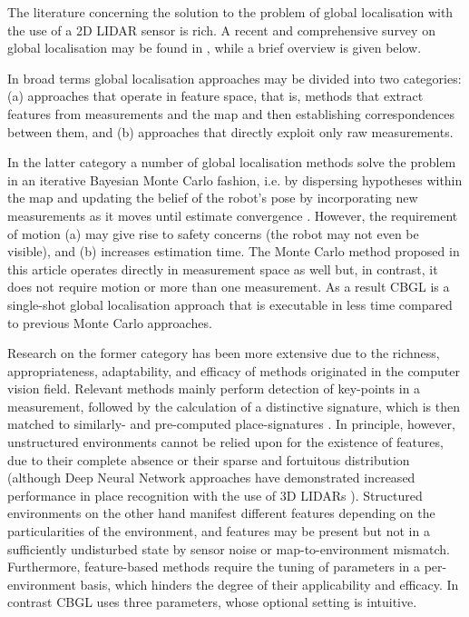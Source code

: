 The literature concerning the solution to the problem of global localisation
with the use of a 2D LIDAR sensor is rich. A recent and comprehensive survey on
global localisation may be found in \cite{gl_survey_cn}, while a brief overview
is given below.

In broad terms global localisation approaches may be divided
into two categories: (a) approaches that operate in feature space, that is,
methods that extract features from measurements and the map and then
establishing correspondences between them, and (b) approaches that directly
exploit only raw measurements.

In the latter category a number of global localisation methods
solve the problem in an iterative Bayesian Monte Carlo fashion, i.e. by
dispersing hypotheses within the map and updating the belief of the robot's
pose by incorporating new measurements as it moves until estimate convergence
\cite{mcl,Wang2018d,Yilmaz2019a,gmcl,Chen2021a}. However, the requirement of
motion (a) may give rise to safety concerns (the robot may not even be
visible), and (b) increases estimation time. The Monte Carlo method proposed in
this article operates directly in measurement space as well but, in contrast,
it does not require motion or more than one measurement. As a result CBGL is a
single-shot global localisation approach that is executable in less time
compared to previous Monte Carlo approaches.

Research on the former category has been more extensive due to the richness,
appropriateness, adaptability, and efficacy of methods originated in the
computer vision field. Relevant methods mainly perform detection of key-points
in a measurement, followed by the calculation of a distinctive signature,
which is then matched to similarly- and pre-computed place-signatures
\cite{Kallasi2016a,als_eth,Usman2019,Wang2021b,Meng2021,Hendrikx2021,An2022,Nielsen2023}.
In principle, however, unstructured environments cannot be relied upon for the
existence of features, due to their complete absence or their sparse and
fortuitous distribution (although Deep Neural Network approaches have
demonstrated increased performance in place recognition with the use of 3D
LIDARs \cite{Xu2021,Yin2022,Komorowski2022}). Structured environments on the
other hand manifest different features depending on the particularities of the
environment, and features may be present but not in a sufficiently
undisturbed state by sensor noise or map-to-environment mismatch. Furthermore,
feature-based methods require the tuning of parameters in a per-environment
basis, which hinders the degree of their applicability and efficacy. In contrast
CBGL uses three parameters, whose optional setting is intuitive.

